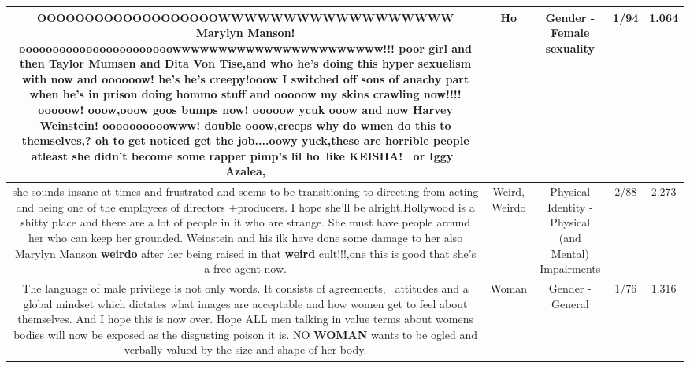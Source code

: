 \documentclass[11pt]{article}
\newlength\mylength
\begin{document}
\begin{center}
\begin{longtable}{|C{.65\mylength}|C{.30\mylength}|C{.12\mylength}|C{.12\mylength}|C{.12\mylength}|}
  \small OOOOOOOOOOOOOOOOOOOWWWWWWWWWWWWWWWWWW Marylyn Manson! ooooooooooooooooooooooowwwwwwwwwwwwwwwwwwwwwww!!! poor girl and then Taylor Mumsen and Dita Von Tise,and who he's doing this hyper sexuelism with now and oooooow! he's he's creepy!ooow I switched off sons of anachy part when he's in prison doing hommo stuff and ooooow my skins crawling now!!!! ooooow! ooow,ooow goos bumps now! ooooow ycuk ooow and now Harvey Weinstein! oooooooooowww! double ooow,creeps why do wmen do this to themselves,? oh to get noticed get the job....oowy yuck,these are horrible people atleast she didn't become some rapper pimp's lil \textbf{ho} like KEISHA!  or Iggy  Azalea,\normalsize   & Ho & Gender - Female sexuality & 1/94 & 1.064 \\  \hline
  \small she sounds insane at times and frustrated and seems to be transitioning to directing from acting and being one of the employees of directors +producers. I hope she'll be alright,Hollywood is a shitty place and there are a lot of people in it who are strange. She must have people around her who can keep her grounded. Weinstein and his ilk have done some damage to her also Marylyn Manson \textbf{weirdo} after her being raised in that \textbf{weird} cult!!!,one this is good that she's a free agent now.\normalsize   & Weird, Weirdo & Physical Identity - Physical (and Mental) Impairments & 2/88 & 2.273 \\  \hline
  \small The language of male privilege is not only words. It consists of agreements,  attitudes and a global mindset which dictates what images are acceptable and how women get to feel about themselves. And I hope this is now over. Hope ALL men talking in value terms about womens bodies will now be exposed as the disgusting poison it is. NO \textbf{WOMAN} wants to be ogled and verbally valued by the size and shape of her body.\normalsize   & Woman & Gender - General & 1/76 & 1.316 \\  \hline

\end{longtable}
\end{center}
\end{document}
